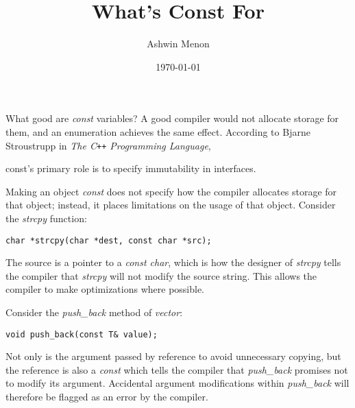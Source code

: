 \documentclass{article}
\begin{document}
\title{What's Const For}
\author{Ashwin Menon}
\date{\today}
\maketitle

What good are \emph{const} variables? A good compiler would not allocate storage for
them, and an enumeration achieves the same effect. According to Bjarne Stroustrupp
in \emph{The C\texttt{++} Programming Language},

\begin{displayquote}
const’s primary role is to specify immutability in interfaces.
\end{displayquote}

Making an object \emph{const} does not specify how the compiler allocates storage
for that object; instead, it places limitations on the usage of that object.
Consider the \emph{strcpy} function:

\begin{lstlisting}
char *strcpy(char *dest, const char *src);
\end{lstlisting}

The source is a pointer to a \emph{const char}, which is how the designer of 
\emph{strcpy} tells the compiler that \emph{strcpy} will not modify the source 
string. This allows the compiler to make optimizations where possible.

Consider the \emph{push\_back} method of \emph{vector}:

\begin{lstlisting}
void push_back(const T& value);
\end{lstlisting}

Not only is the argument passed by reference to avoid unnecessary copying, but
the reference is also a \emph{const} which tells the compiler that \emph{push\_back}
promises not to modify its argument. Accidental argument modifications within 
\emph{push\_back} will therefore be flagged as an error by the compiler.
\end{document}
